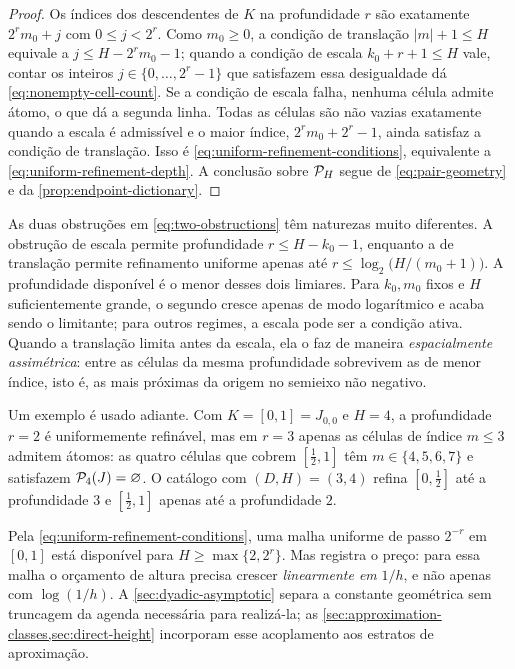 \begin{proof}
Os índices dos descendentes de $K$ na profundidade $r$ são exatamente
$2^rm_0+j$ com $0\le j<2^r$. Como $m_0\ge0$, a condição de translação
$|m|+1\le H$ equivale a $j\le H-2^rm_0-1$; quando a condição de escala
$k_0+r+1\le H$ vale, contar os inteiros $j\in\{0,\ldots,2^r-1\}$ que
satisfazem essa desigualdade dá \eqref{eq:nonempty-cell-count}. Se a condição
de escala falha, nenhuma célula admite átomo, o que dá a segunda linha.
Todas as células são não vazias exatamente quando a escala é admissível e o
maior índice, $2^rm_0+2^r-1$, ainda satisfaz a condição de translação. Isso é
\eqref{eq:uniform-refinement-conditions}, equivalente a
\eqref{eq:uniform-refinement-depth}. A conclusão sobre $\mathcal{P}_H$ segue de
\eqref{eq:pair-geometry} e da \cref{prop:endpoint-dictionary}.
\end{proof}

\begin{remark}
\label{rem:asymmetry}
As duas obstruções em \eqref{eq:two-obstructions} têm naturezas muito
diferentes. A obstrução de escala permite profundidade
$r\le H-k_0-1$, enquanto a de translação permite refinamento uniforme apenas
até $r\le\log_2\bigl(H/(m_0+1)\bigr)$. A profundidade disponível é o menor
desses dois limiares. Para $k_0,m_0$ fixos e $H$ suficientemente grande, o
segundo cresce apenas de modo logarítmico e acaba sendo o limitante; para
outros regimes, a escala pode ser a condição ativa. Quando a translação
limita antes da escala, ela o faz de maneira \emph{espacialmente assimétrica}:
entre as células da mesma profundidade sobrevivem as de menor índice, isto é,
as mais próximas da origem no semieixo não negativo.

Um exemplo é usado adiante. Com $K=[0,1]=J_{0,0}$ e $H=4$, a profundidade
$r=2$ é uniformemente refinável, mas em $r=3$ apenas as células de índice
$m\le3$ admitem átomos: as quatro células que cobrem $[\tfrac12,1]$ têm
$m\in\{4,5,6,7\}$ e satisfazem $\mathcal{P}_4(J)=\varnothing$. O catálogo com
$(D,H)=(3,4)$ refina $[0,\tfrac12]$ até a profundidade $3$ e
$[\tfrac12,1]$ apenas até a profundidade $2$.

Pela \eqref{eq:uniform-refinement-conditions}, uma malha uniforme de passo
$2^{-r}$ em $[0,1]$ está disponível para
$H\ge\max\{2,2^r\}$. Mas registra o preço: para essa malha o orçamento de
altura precisa crescer \emph{linearmente em} $1/h$, e não apenas com
$\log(1/h)$. A \cref{sec:dyadic-asymptotic} separa a constante geométrica sem
truncagem da agenda necessária para realizá-la; as
\cref{sec:approximation-classes,sec:direct-height} incorporam esse acoplamento
aos estratos de aproximação.
\end{remark}
